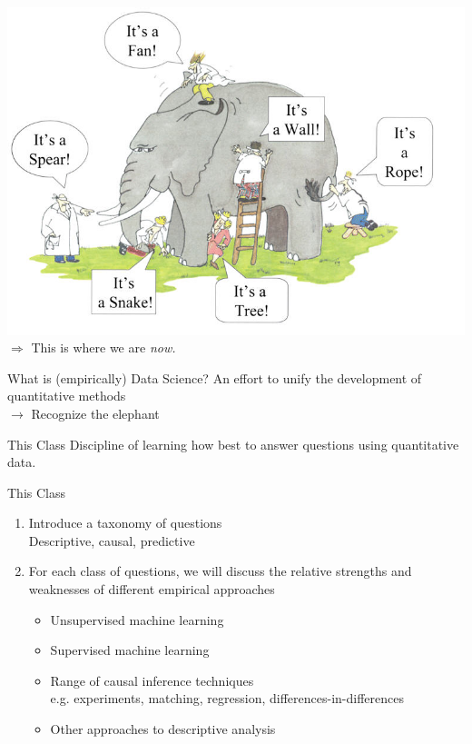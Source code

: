 \documentclass[11pt]{beamer}
\begin{document}
\begin{frame}[c]{}
\includegraphics[width=\textwidth]{blindmenelephant.jpg}
$\Rightarrow$ This is where we are \emph{now.}
\end{frame}

\begin{frame}[c]{What is (empirically) Data Science?}
\pause An effort to unify the development of quantitative methods \\
\pause $\rightarrow$ Recognize the elephant
\end{frame}

\begin{frame}[c]{This Class}
Discipline of learning how best to \alert{answer questions} using \alert{quantitative data.}
\end{frame}

\begin{frame}[c]{This Class}
\begin{enumerate}
  \item Introduce a taxonomy of questions \\
  {\color{gray} Descriptive, causal, predictive}
  \pause \item \alert{For each class of questions}, we will discuss the relative strengths and weaknesses of different empirical approaches
  \begin{itemize}
    \pause \item Unsupervised machine learning
    \item Supervised machine learning
    \item Range of causal inference techniques \\
    {\color{gray}e.g. experiments, matching, regression, differences-in-differences}
    \item Other approaches to descriptive analysis
  \end{itemize}
\end{enumerate}
\end{frame}
\end{document}
